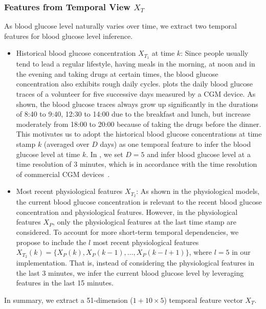 \subsubsection{Features from Temporal View $X_T$}
As blood glucose level naturally varies over time, we extract two temporal features for blood glucose level inference.
\begin{itemize}
  \item
  Historical blood glucose concentration $X_{T_1}$ at time $k$:
  Since people usually tend to lead a regular lifestyle, \eg having meals in the morning, at noon and in the evening and taking drugs at certain times, the blood glucose concentration also exhibits rough daily cycles.
   plots the daily blood glucose traces of a volunteer for five successive days measured by a CGM device. As shown, the blood glucose traces always grow up significantly
  in the durations of 8:40 to 9:40, 12:30 to 14:00 due to the breakfast and lunch, but increase moderately from 18:00 to 20:00 because of taking the drugs before the dinner.
  This motivates us to adopt the historical blood glucose concentrations at time stamp $k$ (averaged over $D$ days) as one temporal feature to infer the blood glucose level at time $k$.
  In \sysname, we set $D=5$ and infer blood glucose level at a time resolution of 3 minutes, which is in accordance with the time resolution of commercial CGM devices~\cite{bib:CGM_wave}.
  \item
  Most recent physiological features $X_{T_2}$:
  As shown in the physiological models, the current blood glucose concentration is relevant to the recent blood glucose concentration and physiological features.
  However, in the physiological features $X_P$, only the physiological features at the last time stamp are considered.
  To account for more short-term temporal dependencies, we propose to include the $l$ most recent physiological features $X_{T_2}(k) = \{X_P(k), X_P(k-1), \ldots, X_P(k-l+1)\}$, where $l=5$ in our implementation.
  That is, instead of considering the physiological features in the last 3 minutes, we infer the current blood glucose level by leveraging features in the last 15 minutes.
\end{itemize}

In summary, we extract a 51-dimension ($1+10\times 5$) temporal feature vector $X_T$.

